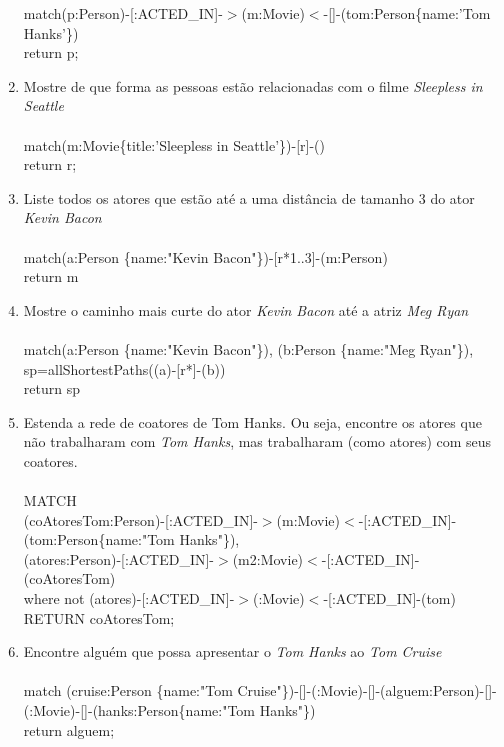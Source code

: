\documentclass[a4paper, 12pt]{article}
\begin{document}
\begin{enumerate}
  match(p:Person)-[:ACTED\_IN]-$>$(m:Movie)$<$-[]-(tom:Person\{name:'Tom Hanks'\}) \\
  return p; \\
\item Mostre de que forma as pessoas estão relacionadas com o filme \emph{Sleepless in Seattle} \\ \\
  match(m:Movie\{title:'Sleepless in Seattle'\})-[r]-() \\
  return r; \\
\item Liste todos os atores que estão até a uma distância de tamanho 3 do ator \emph{Kevin Bacon} \\ \\
  match(a:Person \{name:"Kevin Bacon"\})-[r*1..3]-(m:Person) \\
  return m \\
\item Mostre o caminho mais curte do ator \emph{Kevin Bacon} até a atriz \emph{Meg Ryan} \\ \\
  match(a:Person \{name:"Kevin Bacon"\}), (b:Person \{name:"Meg Ryan"\}), \\
  sp=allShortestPaths((a)-[r*]-(b)) \\
  return sp \\
\item Estenda a rede de coatores de Tom Hanks. Ou seja, encontre os atores que não trabalharam com \emph{Tom Hanks}, mas trabalharam (como atores) com seus coatores. \\ \\
  MATCH \\
      (coAtoresTom:Person)-[:ACTED\_IN]-$>$(m:Movie)$<$-[:ACTED\_IN]-(tom:Person\{name:"Tom Hanks"\}), \\
      (atores:Person)-[:ACTED\_IN]-$>$(m2:Movie)$<$-[:ACTED\_IN]-(coAtoresTom) \\
  where not (atores)-[:ACTED\_IN]-$>$(:Movie)$<$-[:ACTED\_IN]-(tom) \\
  RETURN coAtoresTom; \\
\item Encontre alguém que possa apresentar o \emph{Tom Hanks} ao \emph{Tom Cruise} \\ \\
  match (cruise:Person \{name:"Tom Cruise"\})-[]-(:Movie)-[]-(alguem:Person)-[]-(:Movie)-[]-(hanks:Person\{name:"Tom Hanks"\}) \\
return alguem;

  
\end{enumerate}
\end{document}
